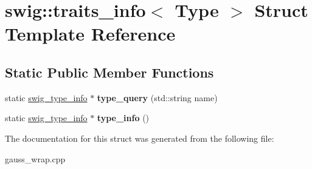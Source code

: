 \hypertarget{structswig_1_1traits__info}{\section{swig\-:\-:traits\-\_\-info$<$ Type $>$ Struct Template Reference}
\label{structswig_1_1traits__info}
}
\subsection*{Static Public Member Functions}
\begin{DoxyCompactItemize}
\item 
\hypertarget{structswig_1_1traits__info_a2616554081419ccfe7f4396f1b8656f9}{static \hyperlink{structswig__type__info}{swig\-\_\-type\-\_\-info} $\ast$ {\bfseries type\-\_\-query} (std\-::string name)}\label{structswig_1_1traits__info_a2616554081419ccfe7f4396f1b8656f9}

\item 
\hypertarget{structswig_1_1traits__info_acfa11e9ee91b0e0319bf8a3707f71084}{static \hyperlink{structswig__type__info}{swig\-\_\-type\-\_\-info} $\ast$ {\bfseries type\-\_\-info} ()}\label{structswig_1_1traits__info_acfa11e9ee91b0e0319bf8a3707f71084}

\end{DoxyCompactItemize}


The documentation for this struct was generated from the following file\-:\begin{DoxyCompactItemize}
\item 
gauss\-\_\-wrap.\-cpp\end{DoxyCompactItemize}
